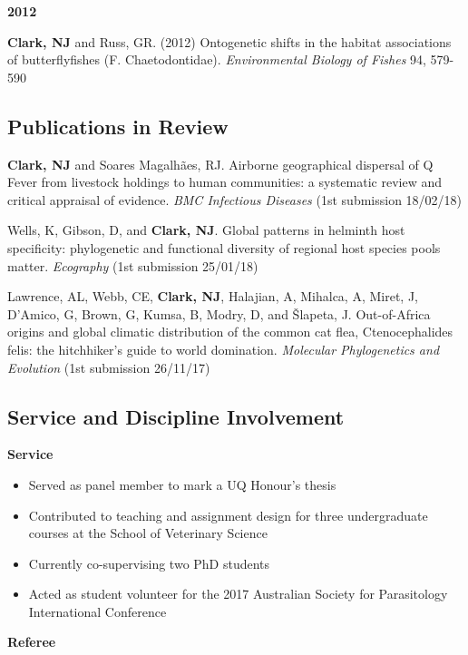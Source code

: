 \documentclass[]{article}
\providecommand{\tightlist}{%
  \setlength{\itemsep}{0pt}\setlength{\parskip}{0pt}}
\begin{document}
\textbf{2012}

\textbf{Clark, NJ} and Russ, GR. (2012) Ontogenetic shifts in the
habitat associations of butterflyfishes (F. Chaetodontidae).
\emph{Environmental Biology of Fishes} 94, 579-590

\subsection{Publications in Review}\label{publications-in-review}

\textbf{Clark, NJ} and Soares Magalhães, RJ. Airborne geographical
dispersal of Q Fever from livestock holdings to human communities: a
systematic review and critical appraisal of evidence. \emph{BMC
Infectious Diseases} (1st submission 18/02/18)

Wells, K, Gibson, D, and \textbf{Clark, NJ}. Global patterns in helminth
host specificity: phylogenetic and functional diversity of regional host
species pools matter. \emph{Ecography} (1st submission 25/01/18)

Lawrence, AL, Webb, CE, \textbf{Clark, NJ}, Halajian, A, Mihalca, A,
Miret, J, D'Amico, G, Brown, G, Kumsa, B, Modry, D, and Šlapeta, J.
Out-of-Africa origins and global climatic distribution of the common cat
flea, Ctenocephalides felis: the hitchhiker's guide to world domination.
\emph{Molecular Phylogenetics and Evolution} (1st submission 26/11/17)

\subsection{Service and Discipline
Involvement}\label{service-and-discipline-involvement}

\textbf{Service}

\begin{itemize}
\tightlist
\item
  Served as panel member to mark a UQ Honour's thesis
\item
  Contributed to teaching and assignment design for three undergraduate
  courses at the School of Veterinary Science
\item
  Currently co-supervising two PhD students
\item
  Acted as student volunteer for the 2017 Australian Society for
  Parasitology International Conference
\end{itemize}

\textbf{Referee}
\end{document}
